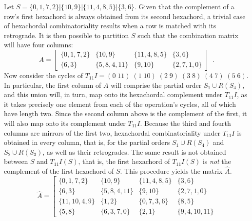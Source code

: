 \begin{example}
	\cite[224]{Starr1984}
	\label{ex:starr-algorithm-2}
    Let $S = \{ 0, 1, 7, 2 \} | \{ 10, 9 \} | \{ 11, 4, 8, 5 \} | \{ 3, 6 \}$. Given that the complement of a row's first hexachord is always obtained from its second hexachord, a trivial case of hexachordal combinatoriality results when a row is matched with its retrograde. It is then possible to partition $S$ such that the combination matrix will have four columns:
    \begin{equation}
        A = \left[
        \begin{array}{c|c|c|c}
        	\{ 0, 1, 7, 2 \} & \{ 10, 9 \} & \{ 11, 4, 8, 5 \} & \{ 3, 6 \} \\
        	\{ 6, 3 \} & \{ 5, 8, 4, 11 \} & \{ 9, 10 \} & \{ 2, 7, 1, 0 \}
        \end{array}
        \right] \enspace.
    \end{equation}
    Now consider the cycles of $T_{11}I = (0 \; 11) \; (1 \; 10) \; (2 \; 9) \; (3 \; 8) \; (4 \; 7) \; (5 \; 6)$. In particular, the first column of $A$ will comprise the partial order $S_1 \cup R(S_4)$, and this union will, in turn, map onto its hexachordal complement under $T_{11}I$, as it takes precisely one element from each of the operation's cycles, all of which have length two. Since the second column above is the complement of the first, it will also map onto its complement under $T_{11}I$. Because the third and fourth columns are mirrors of the first two, hexachordal combinatoriality under $T_{11}I$ is obtained in every column, that is, for the partial orders $S_1 \cup R(S_4)$ and $S_2 \cup R(S_3)$, as well as their retrogrades. The same result is not obtained between $S$ and $T_{11}I(S)$, that is, the first hexachord of $T_{11}I(S)$ is \emph{not} the complement of the first hexachord of $S$. This procedure yields the matrix $\hat{A}$.
    \begin{equation}
        \hat{A} = \left[
        \begin{array}{c|c|c|c}
        	\{ 0, 1, 7, 2 \} & \{ 10, 9 \} & \{ 11, 4, 8, 5 \} & \{ 3, 6 \} \\
        	\{ 6, 3 \} & \{ 5, 8, 4, 11 \} & \{ 9, 10 \} & \{ 2, 7, 1, 0 \} \\
        	\{ 11, 10, 4, 9 \} & \{ 1, 2 \} & \{ 0, 7, 3, 6 \} & \{ 8, 5 \} \\
        	\{ 5, 8 \} & \{ 6, 3, 7, 0 \} & \{ 2, 1 \} & \{ 9, 4, 10, 11 \}
        \end{array}

\end{equation}
\end{example}
